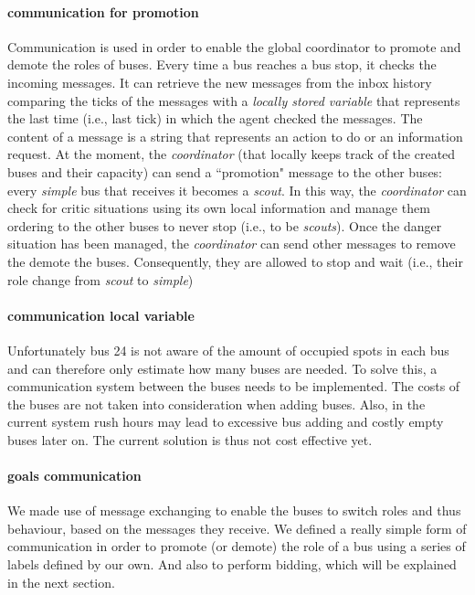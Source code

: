 \documentclass{article}
\begin{document}
\paragraph{communication for promotion}
Communication is used in order to enable the global coordinator to promote and demote the roles of buses. Every time a bus reaches a bus stop, it checks the incoming messages. It can retrieve the new messages from the inbox history comparing the ticks of the messages with a \textit{locally stored variable} that represents the last time (i.e., last tick) in which the agent checked the messages. The content of a message is a string that represents an action to do or an information request. At the moment, the \textit{coordinator} (that locally keeps track of the created buses and their capacity) can send a ``promotion" message to the other buses: every \textit{simple} bus that receives it becomes a \textit{scout}. In this way, the \textit{coordinator} can check for critic situations using its own local information and manage them ordering to the other buses to never stop (i.e., to be \textit{scouts}). Once the danger situation has been managed, the \textit{coordinator} can send other messages to remove the demote the buses. Consequently, they are allowed to stop and wait (i.e., their role change from \textit{scout} to \textit{simple})
\paragraph{communication local variable}
Unfortunately bus 24 is not aware of the amount of occupied spots in each bus and can therefore only estimate how many buses are needed. To solve this, a communication system between the buses needs to be implemented. The costs of the buses are not taken into consideration when adding buses. Also, in the current system rush hours may lead to excessive bus adding and costly empty buses later on. The current solution is thus not cost effective yet.
\paragraph{goals communication}
We made use of message exchanging to enable the buses to switch roles and thus behaviour, based on the messages they receive. We defined a really simple form of communication in order to promote (or demote) the role of a bus using a series of labels defined by our own. And also to perform bidding, which will be explained in the next section.
\end{document}
